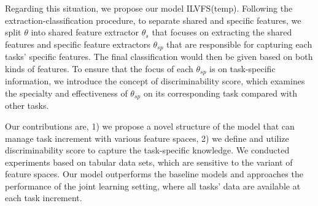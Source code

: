 \documentclass[sigconf,anonymous]{acmart}
\begin{document}
Regarding this situation, we propose our model ILVFS(temp). Following the extraction-classification procedure, to separate shared and specific features, we split $\theta$ into shared feature extractor $\theta_s$ that focuses on extracting the shared features and specific feature extractors $\theta_{sp}$ that are responsible for capturing each tasks' specific features. The final classification would then be given based on both kinds of features. To ensure that the focus of each $\theta_{sp}$ is on task-specific information, we introduce the concept of discriminability score, which examines the specialty and effectiveness of $\theta_{sp}$ on its corresponding task compared with other tasks. 

Our contributions are, 1) we propose a novel structure of the model that can manage task increment with various feature spaces, 2) we define and utilize discriminability score to capture the task-specific knowledge. We conducted experiments based on tabular data sets, which are sensitive to the variant of feature spaces. Our model outperforms the baseline models and approaches the performance of the joint learning setting, where all tasks' data are available at each task increment.





\end{document}
